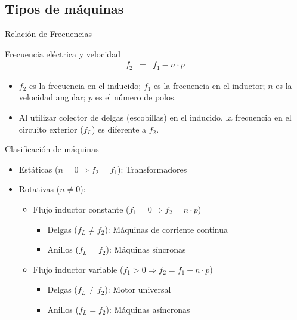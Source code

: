 \documentclass[xcolor={usenames,svgnames,dvipsnames}]{beamer}
\begin{document}
\subsection{Tipos de máquinas}
\label{sec:org19742d9}
\begin{frame}[label={sec:org141acb4}]{Relación de Frecuencias}
\begin{block}{Frecuencia eléctrica y velocidad}
$$\begin{aligned}
  f_{2} & = & f_{1}-n\cdot p\end{aligned}$$

\begin{itemize}
\item \(f_{2}\) es la frecuencia en el inducido; \(f_{1}\) es la frecuencia en
el inductor; \(n\) es la velocidad angular; \(p\) es el número de polos.

\item Al utilizar colector de delgas (escobillas) en el inducido, la
frecuencia en el circuito exterior (\(f_{L}\)) es diferente a \(f_{2}\).
\end{itemize}
\end{block}
\end{frame}

\begin{frame}[label={sec:orga6d20a2}]{Clasificación de máquinas}
\begin{itemize}
\item Estáticas (\(n=0\Rightarrow f_{2}=f_{1}\)): Transformadores

\item Rotativas (\(n\neq0\)):

\begin{itemize}
\item Flujo inductor constante (\(f_{1}=0\Rightarrow f_{2}=n\cdot
            p\))

\begin{itemize}
\item Delgas (\(f_{L}\neq f_{2}\)): Máquinas de corriente continua

\item Anillos (\(f_{L}=f_{2}\)): Máquinas síncronas
\end{itemize}

\item Flujo inductor variable (\(f_{1}>0\Rightarrow
            f_{2}=f_{1}-n\cdot p\))

\begin{itemize}
\item Delgas (\(f_{L}\neq f_{2}\)): Motor universal

\item Anillos (\(f_{L}=f_{2}\)): Máquinas asíncronas
\end{itemize}
\end{itemize}
\end{itemize}
\end{frame}
\end{document}
